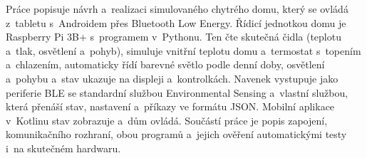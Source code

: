 Práce popisuje návrh a~realizaci simulovaného chytrého domu, který se ovládá z~tabletu
s~Androidem přes Bluetooth Low Energy. Řídicí jednotkou domu je Raspberry Pi 3B+ s~programem
v~Pythonu. Ten čte skutečná čidla (teplotu a~tlak, osvětlení a~pohyb), simuluje vnitřní teplotu
domu a~termostat s~topením a~chlazením, automaticky řídí barevné světlo podle denní doby,
osvětlení a~pohybu a~stav ukazuje na displeji a~kontrolkách. Navenek vystupuje jako periferie
BLE se standardní službou Environmental Sensing a~vlastní službou, která přenáší stav, nastavení
a~příkazy ve formátu JSON. Mobilní aplikace v~Kotlinu stav zobrazuje a~dům ovládá. Součástí
práce je popis zapojení, komunikačního rozhraní, obou programů a~jejich ověření automatickými
testy i~na skutečném hardwaru.

